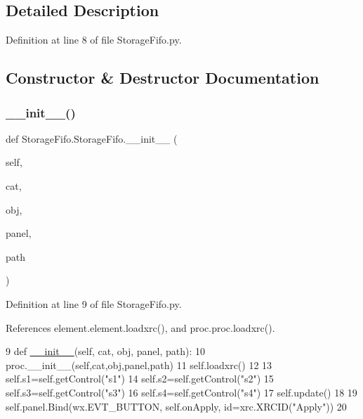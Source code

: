 \subsection{Detailed Description}


Definition at line 8 of file Storage\+Fifo.\+py.



\subsection{Constructor \& Destructor Documentation}
\mbox{\label{classStorageFifo_1_1StorageFifo_a7ee1fe240661a6d0ad47bcdb866dabba}} 
\subsubsection{\texorpdfstring{\+\_\+\+\_\+init\+\_\+\+\_\+()}{\_\_init\_\_()}}
{\footnotesize\ttfamily def Storage\+Fifo.\+Storage\+Fifo.\+\_\+\+\_\+init\+\_\+\+\_\+ (\begin{DoxyParamCaption}\item[{}]{self,  }\item[{}]{cat,  }\item[{}]{obj,  }\item[{}]{panel,  }\item[{}]{path }\end{DoxyParamCaption})}



Definition at line 9 of file Storage\+Fifo.\+py.



References element.\+element.\+loadxrc(), and proc.\+proc.\+loadxrc().


\begin{DoxyCode}
9     \textcolor{keyword}{def }\hyperlink{classwrapper_1_1ModuleDictWrapper_a9a7a794150502f51df687831583e13b9}{\_\_init\_\_}(self, cat, obj, panel, path):
10         proc.\_\_init\_\_(self,cat,obj,panel,path)
11         self.loadxrc()
12 
13         self.s1=self.getControl(\textcolor{stringliteral}{"s1"})
14         self.s2=self.getControl(\textcolor{stringliteral}{"s2"})
15         self.s3=self.getControl(\textcolor{stringliteral}{"s3"})
16         self.s4=self.getControl(\textcolor{stringliteral}{"s4"})
17         self.update()
18 
19         self.panel.Bind(wx.EVT\_BUTTON, self.onApply, id=xrc.XRCID(\textcolor{stringliteral}{"Apply"}))
20 
\end{DoxyCode}


